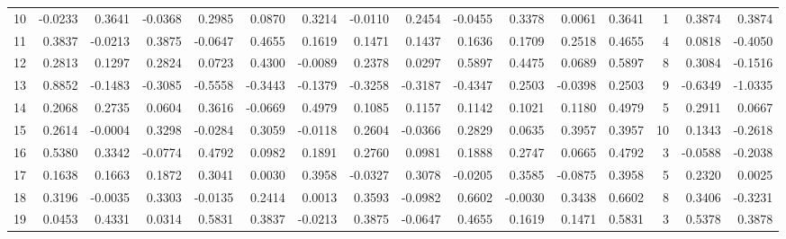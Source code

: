 \begin{tabular}{lrrrrrrrrrrrrrrr}
10 &     -0.0233 &  0.3641 & -0.0368 &  0.2985 &  0.0870 &  0.3214 & -0.0110 &  0.2454 & -0.0455 &  0.3378 &   0.0061 &     0.3641 &      1 &                    0.3874 &                     0.3874 \\
11 &      0.3837 & -0.0213 &  0.3875 & -0.0647 &  0.4655 &  0.1619 &  0.1471 &  0.1437 &  0.1636 &  0.1709 &   0.2518 &     0.4655 &      4 &                    0.0818 &                    -0.4050 \\
12 &      0.2813 &  0.1297 &  0.2824 &  0.0723 &  0.4300 & -0.0089 &  0.2378 &  0.0297 &  0.5897 &  0.4475 &   0.0689 &     0.5897 &      8 &                    0.3084 &                    -0.1516 \\
13 &      0.8852 & -0.1483 & -0.3085 & -0.5558 & -0.3443 & -0.1379 & -0.3258 & -0.3187 & -0.4347 &  0.2503 &  -0.0398 &     0.2503 &      9 &                   -0.6349 &                    -1.0335 \\
14 &      0.2068 &  0.2735 &  0.0604 &  0.3616 & -0.0669 &  0.4979 &  0.1085 &  0.1157 &  0.1142 &  0.1021 &   0.1180 &     0.4979 &      5 &                    0.2911 &                     0.0667 \\
15 &      0.2614 & -0.0004 &  0.3298 & -0.0284 &  0.3059 & -0.0118 &  0.2604 & -0.0366 &  0.2829 &  0.0635 &   0.3957 &     0.3957 &     10 &                    0.1343 &                    -0.2618 \\
16 &      0.5380 &  0.3342 & -0.0774 &  0.4792 &  0.0982 &  0.1891 &  0.2760 &  0.0981 &  0.1888 &  0.2747 &   0.0665 &     0.4792 &      3 &                   -0.0588 &                    -0.2038 \\
17 &      0.1638 &  0.1663 &  0.1872 &  0.3041 &  0.0030 &  0.3958 & -0.0327 &  0.3078 & -0.0205 &  0.3585 &  -0.0875 &     0.3958 &      5 &                    0.2320 &                     0.0025 \\
18 &      0.3196 & -0.0035 &  0.3303 & -0.0135 &  0.2414 &  0.0013 &  0.3593 & -0.0982 &  0.6602 & -0.0030 &   0.3438 &     0.6602 &      8 &                    0.3406 &                    -0.3231 \\
19 &      0.0453 &  0.4331 &  0.0314 &  0.5831 &  0.3837 & -0.0213 &  0.3875 & -0.0647 &  0.4655 &  0.1619 &   0.1471 &     0.5831 &      3 &                    0.5378 &                     0.3878 \\
\bottomrule
\end{tabular}
